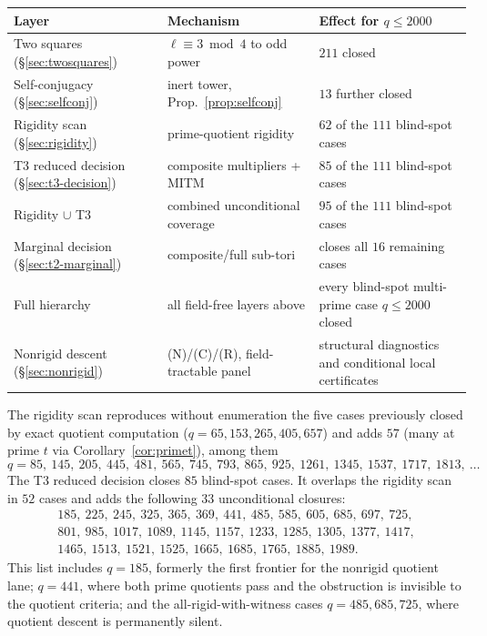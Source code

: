 \documentclass[11pt]{article}
\theoremstyle{plain}
\theoremstyle{definition}
\theoremstyle{remark}
\begin{document}
\begin{center}
\small
\begin{tabular}{p{} p{} p{}}
\hline
Layer & Mechanism & Effect for $q\le2000$\\
\hline
Two squares (\S\ref{sec:twosquares}) & $\ell\equiv3\bmod4$ to odd power &
$211$ closed\\
Self-conjugacy (\S\ref{sec:selfconj}) & inert tower, Prop.~\ref{prop:selfconj} &
$13$ further closed\\
Rigidity scan (\S\ref{sec:rigidity}) & prime-quotient rigidity &
$62$ of the $111$ blind-spot cases\\
T3 reduced decision (\S\ref{sec:t3-decision}) & composite multipliers + MITM &
$85$ of the $111$ blind-spot cases\\
Rigidity $\cup$ T3 & combined unconditional coverage &
$95$ of the $111$ blind-spot cases\\
Marginal decision (\S\ref{sec:t2-marginal}) & composite/full sub-tori &
closes all $16$ remaining cases\\
Full hierarchy & all field-free layers above &
every blind-spot multi-prime case $q\le2000$ closed\\
Nonrigid descent (\S\ref{sec:nonrigid}) & (N)/(C)/(R), field-tractable panel &
structural diagnostics and conditional local certificates\\
\hline
\end{tabular}
\end{center}

The rigidity scan reproduces without enumeration the five cases previously
closed by exact quotient computation ($q=65,153,265,405,657$) and adds $57$
(many at prime $t$ via Corollary~\ref{cor:primet}), among them
\[
  q=85,\ 145,\ 205,\ 445,\ 481,\ 565,\ 745,\ 793,\ 865,\ 925,\ 1261,\ 1345,\
  1537,\ 1717,\ 1813,\ \dots
\]
The T3 reduced decision closes $85$ blind-spot cases. It overlaps the rigidity
scan in $52$ cases and adds the following $33$ unconditional closures:
\[
\begin{gathered}
185,\ 225,\ 245,\ 325,\ 365,\ 369,\ 441,\ 485,\ 585,\ 605,\ 685,\ 697,\ 725,\\
801,\ 985,\ 1017,\ 1089,\ 1145,\ 1157,\ 1233,\ 1285,\ 1305,\ 1377,\ 1417,\\
1465,\ 1513,\ 1521,\ 1525,\ 1665,\ 1685,\ 1765,\ 1885,\ 1989 .
\end{gathered}
\]
This list includes $q=185$, formerly the first frontier for the nonrigid
quotient lane; $q=441$, where both prime quotients pass and the obstruction is
invisible to the quotient criteria; and the all-rigid-with-witness cases
$q=485,685,725$, where quotient descent is permanently silent.
\end{document}
